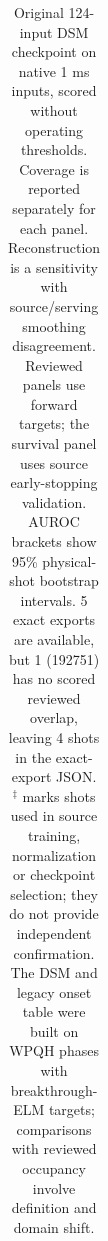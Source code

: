 \begin{table}[t]
\begin{tabular}{lrrrcc}
\bottomrule
\end{tabular}\caption{Original 124-input DSM checkpoint on native 1 ms inputs, scored without operating thresholds. Coverage is reported separately for each panel. Reconstruction is a sensitivity with source/serving smoothing disagreement. Reviewed panels use forward targets; the survival panel uses source early-stopping validation. AUROC brackets show 95\% physical-shot bootstrap intervals. 5 exact exports are available, but 1 (192751) has no scored reviewed overlap, leaving 4 shots in the exact-export JSON. $^{\ddagger}$ marks shots used in source training, normalization or checkpoint selection; they do not provide independent confirmation. The DSM and legacy onset table were built on WPQH phases with breakthrough-ELM targets; comparisons with reviewed occupancy involve definition and domain shift.}
\label{tab:elm-dsm-native}
\end{table}
